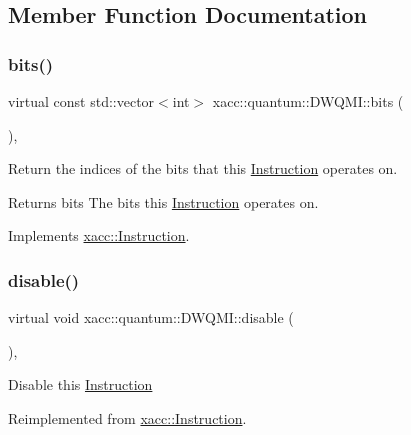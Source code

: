\subsection{Member Function Documentation}
\mbox{\label{a01225_a76939c29e4763d10c57ea9a270229421}} 
\subsubsection{\texorpdfstring{bits()}{bits()}}
{\footnotesize\ttfamily virtual const std\+::vector$<$int$>$ xacc\+::quantum\+::\+D\+W\+Q\+M\+I\+::bits (\begin{DoxyParamCaption}{ }\end{DoxyParamCaption})\hspace{0.3cm}{\ttfamily [inline]}, {\ttfamily [virtual]}}

Return the indices of the bits that this \hyperlink{a01657}{Instruction} operates on.

\begin{DoxyReturn}{Returns}
bits The bits this \hyperlink{a01657}{Instruction} operates on. 
\end{DoxyReturn}


Implements \hyperlink{a01657_a819f32e94c3e1c9e69a0061aaf8d86dc}{xacc\+::\+Instruction}.

\mbox{\label{a01225_af6d9120d8f60984767a330d5cfe9140f}} 
\subsubsection{\texorpdfstring{disable()}{disable()}}
{\footnotesize\ttfamily virtual void xacc\+::quantum\+::\+D\+W\+Q\+M\+I\+::disable (\begin{DoxyParamCaption}{ }\end{DoxyParamCaption})\hspace{0.3cm}{\ttfamily [inline]}, {\ttfamily [virtual]}}

Disable this \hyperlink{a01657}{Instruction} 

Reimplemented from \hyperlink{a01657_a6e528da15e05a94cc1d7db268c483271}{xacc\+::\+Instruction}.

